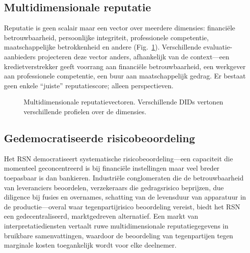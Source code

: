 \documentclass[11pt,a4paper,twocolumn]{article}
\begin{document}
\subsection{Multidimensionale reputatie}

Reputatie is geen scalair maar een vector over meerdere dimensies: financiële betrouwbaarheid, persoonlijke integriteit, professionele competentie, maatschappelijke betrokkenheid en andere (Fig.~\ref{fig:reputation-radar}). Verschillende evaluatie-aanbieders projecteren deze vector anders, afhankelijk van de context---een kredietverstrekker geeft voorrang aan financiële betrouwbaarheid, een werkgever aan professionele competentie, een buur aan maatschappelijk gedrag. Er bestaat geen enkele ``juiste'' reputatiescore; alleen perspectieven.

\begin{figure}[ht]
\centering
{}
\caption{Multidimensionale reputatievectoren. Verschillende DIDs vertonen verschillende profielen over de dimensies.}
\label{fig:reputation-radar}
\end{figure}

\subsection{Gedemocratiseerde risicobeoordeling}

Het RSN democratiseert systematische risicobeoordeling---een capaciteit die momenteel geconcentreerd is bij financiële instellingen maar veel breder toepasbaar is dan bankieren. Industriële conglomeraten die de betrouwbaarheid van leveranciers beoordelen, verzekeraars die gedragsrisico beprijzen, due diligence bij fusies en overnames, schatting van de levensduur van apparatuur in de productie---overal waar tegenpartijrisico beoordeling vereist, biedt het RSN een gedecentraliseerd, marktgedreven alternatief. Een markt van interpretatiediensten vertaalt ruwe multidimensionale reputatiegegevens in bruikbare samenvattingen, waardoor de beoordeling van tegenpartijen tegen marginale kosten toegankelijk wordt voor elke deelnemer.
\end{document}
